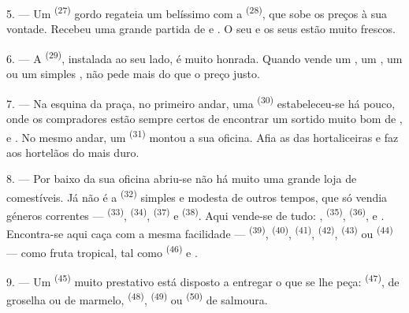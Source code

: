 5. --- Um  \textsuperscript{(27)} gordo regateia um belíssimo
 com a  \textsuperscript{(28)}, que sobe os preços à
sua vontade. Recebeu uma grande partida de  e . O seu  e os seus
 estão muito frescos.

\VUsaut{4.0mm}
\VUsaut{3.0mm}

6. --- A  \textsuperscript{(29)}, instalada ao seu lado,
é muito honrada. Quando vende um , um , um
 ou um simples , não pede mais do que o preço
justo.

7. --- Na esquina da praça, no primeiro andar, uma  \textsuperscript{(30)} estabeleceu-se há pouco, onde os compradores
estão sempre certos de encontrar um sortido muito bom de ,  e . No mesmo
andar, um  \textsuperscript{(31)} montou a sua oficina. Afia as
 das hortaliceiras e faz aos hortelãos  do
 mais duro.

\VUsaut{4.0mm}
\VUsaut{3.0mm}

8. --- Por baixo da sua oficina abriu-se não há muito uma grande loja de
comestíveis. Já não é a  \textsuperscript{(32)} simples e modesta
de outros tempos, que só vendia géneros correntes --- 
\textsuperscript{(33)},  \textsuperscript{(34)}, 
\textsuperscript{(37)} e  \textsuperscript{(38)}. Aqui vende-se de tudo:
,  \textsuperscript{(35)},
 \textsuperscript{(36)},  e
. Encontra-se aqui caça com a mesma facilidade ---
 \textsuperscript{(39)},  \textsuperscript{(40)},
 \textsuperscript{(41)},  \textsuperscript{(42)},
 \textsuperscript{(43)} ou  \textsuperscript{(44)} ---
como fruta tropical, tal como  \textsuperscript{(46)} e
.

9. --- Um  \textsuperscript{(45)} muito prestativo está disposto a
entregar o que se lhe peça:  \textsuperscript{(47)}, de groselha ou
de marmelo,  \textsuperscript{(48)}, 
\textsuperscript{(49)} ou  \textsuperscript{(50)} de salmoura.

